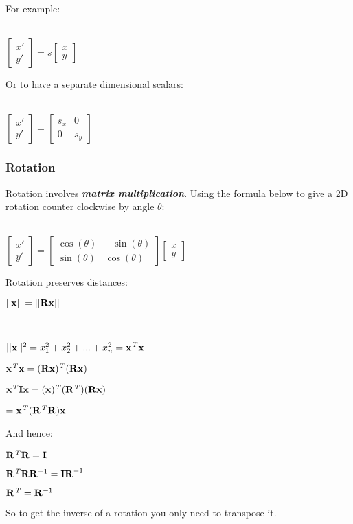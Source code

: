 \documentclass{article}\author{Hawley, Adam}
\begin{document}
For example: \\~\\
\centerline{$
\begin{bmatrix}
x' \\ y'
\end{bmatrix}
= s 
\begin{bmatrix}
x \\ y
\end{bmatrix}$}

Or to have a separate dimensional scalars:\\ \\
\centerline{$
\begin{bmatrix}
x' \\ y'
\end{bmatrix} = 
\begin{bmatrix}
	s_x&0\\
	0&s_y
\end{bmatrix} $}
\subsubsection{Rotation}
Rotation involves {\textbf{\textit{matrix multiplication}}}. Using the formula below to give a 2D rotation counter clockwise by angle $\theta$:
\\~\\
\centerline{$
	\begin{bmatrix}
		x' \\ y'
	\end{bmatrix} = 
	\begin{bmatrix}
		\cos(\theta) & -\sin(\theta)\\
		\sin(\theta) & \cos(\theta)
	\end{bmatrix}
	\begin{bmatrix}
		x \\ y
	\end{bmatrix}
$}

Rotation preserves distances: \\
\centerline{$ ||{\bf x}|| = ||{\bf Rx}|| $}\\
\centerline{$||{\bf x}||^2 = x^2_1 + x^2_2 + ... + x^2_n = {\bf x}{\it ^T}{\bf x} $}
\centerline{${\bf x}{\it ^T}{\bf x} = ({\bf Rx}){\it ^T}({\bf Rx}) 
$}
\centerline{${\bf x}{\it ^T}{\bf Ix} = ({\bf x}){\it ^T}({\bf R}{\it ^T})({\bf Rx}) 	
$}
\centerline{$ = {\bf x}{\it ^T}({\bf R}{\it ^T}{\bf R}){\bf x}  
$}
And hence: \\ \centerline{$ {\bf R}{\it ^T}{\bf R} = {\bf I} $} 
\centerline{$ {\bf R}{\it ^T} {\bf R} {\bf R}^{-1} = {\bf IR}^{-1} $}    
\centerline{$ {\bf R}{\it ^T} = {\bf R}^{-1}  $}
So to get the inverse of a rotation you only need to transpose it.
\end{document}
